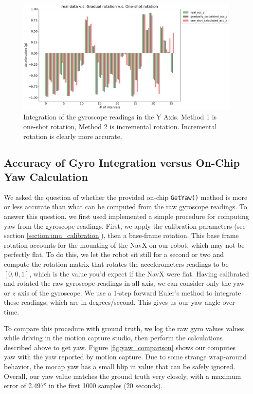 \documentclass{article}
\begin{document}
    \begin{figure}[H]
      \centering
      \includegraphics[width=1\linewidth]{./images/gyro_integration_y.png}
      \caption{Integration of the gyroscope readings in the Y Axis. Method 1 is one-shot rotation, Method 2 is incremental rotation. Incremental rotation is clearly more accurate.}
      \label{fig:gyro_integration}
    \end{figure}

  \subsection{Accuracy of Gyro Integration versus On-Chip Yaw Calculation}

    We asked the question of whether the provided on-chip \texttt{GetYaw()} method is more or less accurate than what can be computed from the raw gyroscope readings. To answer this question, we first used implemented a simple procedure for computing yaw from the gyroscope readings. First, we apply the calibration parameters (see section \ref{section:imu_calibration}), then a base-frame rotation. This base frame rotation accounts for the mounting of the NavX on our robot, which may not be perfectly flat. To do this, we let the robot sit still for a second or two and compute the rotation matrix that rotates the accelerometers readings to be $[0,0,1]$, which is the value you'd expect if the NavX were flat. Having calibrated and rotated the raw gyroscope readings in all axis, we can consider only the yaw or $z$ axis of the gyroscope. We use a 1-step forward Euler's method to integrate these readings, which are in degrees/second. This gives us our yaw angle over time.

    To compare this procedure with ground truth, we log the raw gyro values values while driving in the motion capture studio, then perform the calculations described above to get yaw. Figure \ref{fig:yaw_comparison} shows our computes yaw with the yaw reported by motion capture. Due to some strange wrap-around behavior, the mocap yaw has a small blip in value that can be safely ignored. Overall, our yaw value matches the ground truth very closely, with a maximum error of \ang{2.497} in the first 1000 samples (20 seconds).
\end{document}
